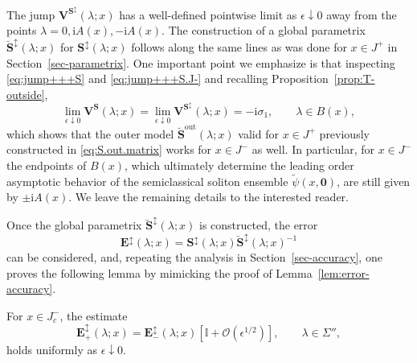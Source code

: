 \documentclass[12pt]{amsart}
\numberwithin{equation}{section}
\newcommand{\ii}{\mathrm{i}}
\newcommand{\SP}{\lambda}
\newcommand{\eps}{\epsilon}
\newcommand{\bigo}[1]{ \mathcal{O}\! \left( #1 \right) }
\begin{document}
The jump $\mathbf{V}^{\mathbf{S}^\updownarrow}(\SP;x)$ has a well-defined pointwise limit as $\eps \downarrow 0$ away from the points $\SP = 0, \ii A(x), -\ii A(x)$. 
The construction of a global parametrix $\breve{\mathbf{S}}^\updownarrow(\SP;x)$ for $\mathbf{S}^\updownarrow(\SP;x)$ follows along the same lines as was done for $x\in J^+$ in Section~\ref{sec-parametrix}. One important point we emphasize is that inspecting \eqref{eq:jump+++S} and \eqref{eq:jump+++S.J-} and recalling Proposition~\ref{prop:T-outside}, 
\begin{equation}
	\lim_{\epsilon \downarrow 0} \mathbf{V}^\mathbf{S}(\SP;x) = \lim_{\epsilon \downarrow 0} \mathbf{V}^{\mathbf{S}^\updownarrow}(\SP;x) = -\ii \sigma_1, \qquad \SP \in B(x),
\end{equation}
which shows that the outer model $\breve{\mathbf{S}}^\mathrm{out}(\SP;x)$ valid for $x \in J^+$ previously constructed in \eqref{eq:S.out.matrix} works for $x \in J^-$ as well.  In particular, for $x \in J^-$ the endpoints of $B(x)$, which ultimately determine the leading order asymptotic behavior of the semiclassical soliton ensemble $\widetilde{\psi}(x,\mathbf{0})$, are still given by $\pm \ii A(x)$. 
We leave the remaining details to the interested reader. 

Once the global parametrix $\breve{\mathbf{S}}^\updownarrow(\SP;x)$ is constructed, the error 
\begin{equation}
	\mathbf{E}^\updownarrow(\SP;x) = \mathbf{S}^\updownarrow(\SP;x) \breve{\mathbf{S}}^\updownarrow(\SP;x)^{-1}
	\label{eq:Edef-left}
\end{equation}
can be considered, and, repeating the analysis in Section~\ref{sec-accuracy}, one proves the following lemma by mimicking the proof of Lemma~\ref{lem:error-accuracy}.
\begin{lem} 
For $x \in J^-_c $, the estimate
\begin{equation}
	\mathbf{E}^\updownarrow_+(\SP;x) = \mathbf{E}^\updownarrow_-(\SP;x) \left[ \mathbb{I} + \bigo{\eps^{1/2}} \right], \qquad  \SP \in \Sigma'',
\end{equation}
holds uniformly as $\eps \downarrow 0$.
\label{lem:error-accuracy-2}
\end{lem}






\end{document}
